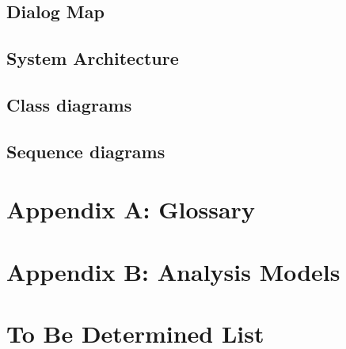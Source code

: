 \documentclass[a4paper]{scrreprt}
\begin{document}
\section{Dialog Map}
\section{System Architecture}
\section{Class diagrams}
\section{Sequence diagrams}


\chapter{Appendix A: Glossary}

\chapter{Appendix B: Analysis Models}

\chapter{To Be Determined List}
\end{document}
